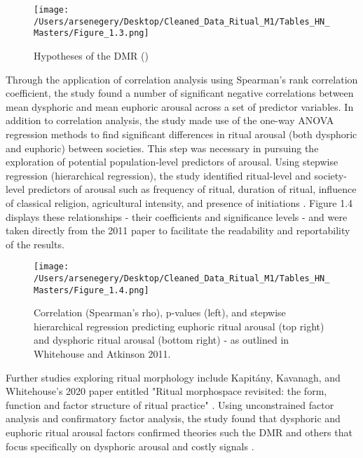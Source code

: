 \documentclass[12pt]{report}
\begin{document}
	\begin{figure}[htbp]
		\centering
		\texttt{[image: /Users/arsenegery/Desktop/Cleaned\_Data\_Ritual\_M1/Tables\_HN\_Masters/Figure\_1.3.png]} %
		\caption{Hypotheses of the DMR (\cite{atkinson2011})}
		\label{fig:table3}
	\end{figure}
	
	\noindent Through the application of correlation analysis using Spearman's rank correlation coefficient, the study found a number of significant negative correlations between mean dysphoric and mean euphoric arousal across a set of predictor variables. In addition to correlation analysis, the study made use of the one-way ANOVA regression methods  to find significant differences in ritual arousal (both dysphoric and euphoric) between societies. This step was necessary in pursuing the exploration of potential population-level predictors of arousal. Using stepwise regression (hierarchical regression), the study identified ritual-level and society-level predictors of arousal such as frequency of ritual, duration of ritual, influence of classical religion, agricultural intensity, and presence of initiations \cite{atkinson2011}. Figure 1.4 displays these relationships - their coefficients and significance levels - and were taken directly from the 2011 paper to facilitate the readability and reportability of the results.\\
	
	\begin{figure}[htbp]
		\centering
		\texttt{[image: /Users/arsenegery/Desktop/Cleaned\_Data\_Ritual\_M1/Tables\_HN\_Masters/Figure\_1.4.png]} %
		\caption{Correlation (Spearman's rho), p-values (left), and stepwise hierarchical regression predicting euphoric ritual arousal (top right) and dysphoric ritual arousal (bottom right) - as outlined in Whitehouse and Atkinson 2011.} 
		\label{fig:table4}
	\end{figure}
	
	\noindent Further studies exploring ritual morphology include Kapitány, Kavanagh, and Whitehouse’s 2020 paper entitled "Ritual morphospace revisited: the form, function and factor structure of ritual practice" \cite{kapitany2020}. Using unconstrained factor analysis and confirmatory factor analysis, the study found that dysphoric and euphoric ritual arousal factors confirmed theories such the DMR and others that focus specifically on dysphoric arousal and costly signals \cite{schjoedt2013}\cite{henrich2009}.
	
\end{document}
